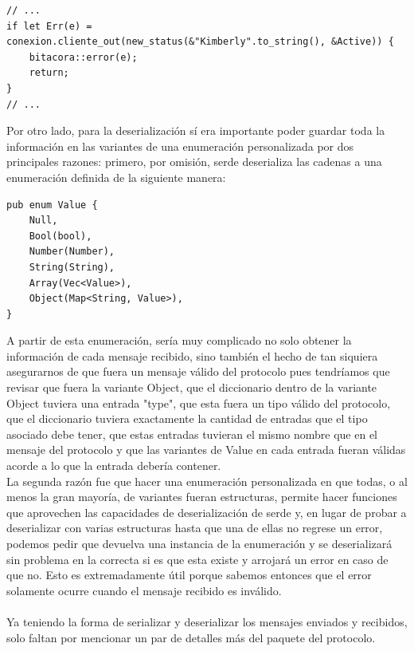 \documentclass[11pt]{article}
\begin{document}
\begin{verbatim}
// ...
if let Err(e) = conexion.cliente_out(new_status(&"Kimberly".to_string(), &Active)) {
    bitacora::error(e);
    return;
}
// ...
\end{verbatim}
Por otro lado, para la deserialización sí era importante poder guardar toda la información en las variantes de una enumeración personalizada por dos principales razones: primero, por omisión, serde deserializa las cadenas a una enumeración definida de la siguiente manera:
\begin{verbatim}
pub enum Value {
    Null,
    Bool(bool),
    Number(Number),
    String(String),
    Array(Vec<Value>),
    Object(Map<String, Value>),
}
\end{verbatim}
A partir de esta enumeración, sería muy complicado no solo obtener la información de cada mensaje recibido, sino también el hecho de tan siquiera asegurarnos de que fuera un mensaje válido del protocolo pues tendríamos que revisar que fuera la variante Object, que el diccionario dentro de la variante Object tuviera una entrada "type", que esta fuera un tipo válido del protocolo, que el diccionario tuviera exactamente la cantidad de entradas que el tipo asociado debe tener, que estas entradas tuvieran el mismo nombre que en el mensaje del protocolo y que las variantes de Value en cada entrada fueran válidas acorde a lo que la entrada debería contener.\\
La segunda razón fue que hacer una enumeración personalizada en que todas, o al menos la gran mayoría, de variantes fueran estructuras, permite hacer funciones que aprovechen las capacidades de deserialización de serde y, en lugar de probar a deserializar con varias estructuras hasta que una de ellas no regrese un error, podemos pedir que devuelva una instancia de la enumeración y se deserializará sin problema en la correcta si es que esta existe y arrojará un error en caso de que no. Esto es extremadamente útil porque sabemos entonces que el error solamente ocurre cuando el mensaje recibido es inválido.\\\\
Ya teniendo la forma de serializar y deserializar los mensajes enviados y recibidos, solo faltan por mencionar un par de detalles más del paquete del protocolo.
\end{document}
